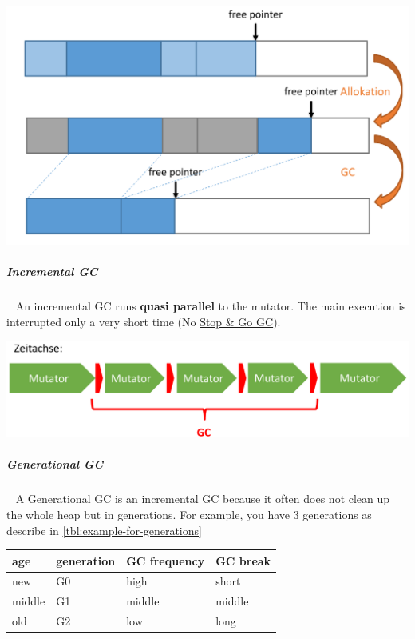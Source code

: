 \documentclass[11pt,twoside,landscape]{article}
\begin{document}
\begin{multicols}{3}
{
\begin{center}
\includegraphics[width=.9\linewidth]{img/compacting_gc.png}
\end{center}
\label{fig:compacting-gc-example}
}
\subparagraph{Incremental GC} \
\label{sec:orgca58502}
An incremental GC runs \textbf{quasi parallel} to the mutator.
The main execution is interrupted only a very short time (No \href{../../../roam/20221230204307-when_is_the_garbage_collector_executed.org}{Stop \& Go GC}).


{
\begin{center}
\includegraphics[width=.9\linewidth]{img/incremental_gc.png}
\end{center}
\label{fig:incremental-gc}
}

\subparagraph{Generational GC} \
\label{sec:org293b444}
A Generational GC is an incremental GC because it often does not clean up the whole heap but in generations.
For example, you have 3 generations as describe in \autoref{tbl:example-for-generations}

{
\begin{center}
\begin{tabular}{llll}
age & generation & GC frequency & GC break\\[0pt]
\hline
new & G0 & high & short\\[0pt]
middle & G1 & middle & middle\\[0pt]
old & G2 & low & long\\[0pt]
\end{tabular}
\end{center}
\label{tbl:example-for-generations}
}


\end{multicols}
\end{document}
